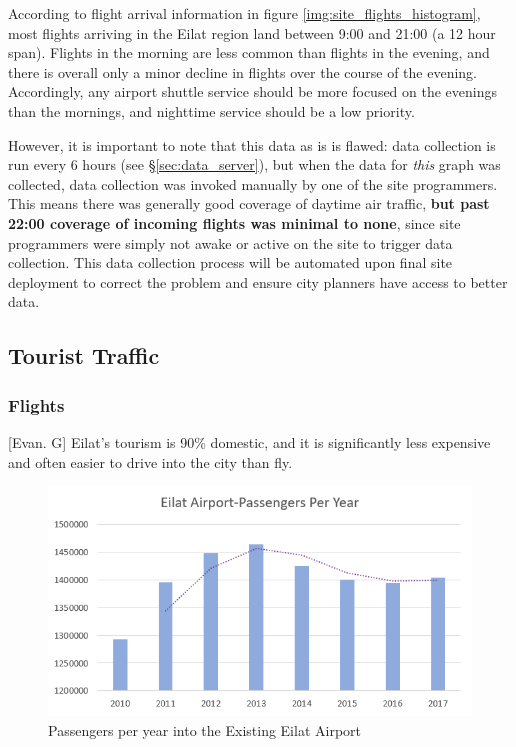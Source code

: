 \documentclass[12pt]{article}                               %
\begin{document}
According to flight arrival information in figure \ref{img:site_flights_histogram}, most flights arriving in the Eilat region land between 9:00 and 21:00 (a 12 hour span). Flights in the morning are less common than flights in the evening, and there is overall only a minor decline in flights over the course of the evening. Accordingly, any airport shuttle service should be more focused on the evenings than the mornings, and nighttime service should be a low priority.

However, it is important to note that this data as is is flawed: data collection is run every 6 hours (see \S\ref{sec:data_server}), but when the data for \textit{this} graph was collected, data collection was invoked manually by one of the site programmers. This means there was generally good coverage of daytime air traffic, \textbf{but past 22:00 coverage of incoming flights was minimal to none}, since site programmers were simply not awake or active on the site to trigger data collection. This data collection process will be automated upon final site deployment to correct the problem and ensure city planners have access to better data.

\subsection{Tourist Traffic}
\subsubsection{Flights}[Evan. G]
Eilat's tourism is 90\% domestic, and it is significantly less expensive and often easier to drive into the city than fly. 
\begin{figure}[H]
    \centering
    \includegraphics[width=1\columnwidth]{images/passengers_per_year.png}
    \caption{Passengers per year into the Existing Eilat Airport}
    \label{img:passengers_per_year}
\end{figure}
\end{document}
